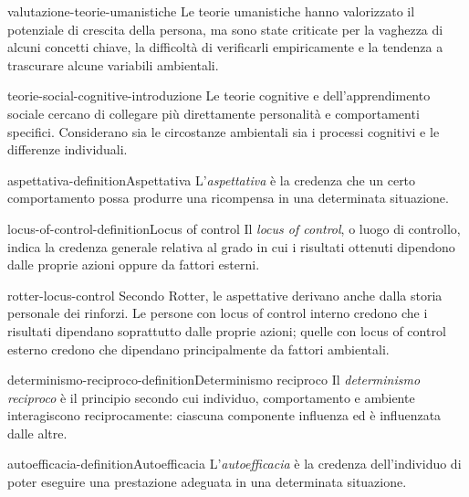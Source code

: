 \documentclass[preview]{standalone}
\begin{document}
\begin{snippet}{valutazione-teorie-umanistiche}
    Le teorie umanistiche hanno valorizzato il potenziale di crescita della
    persona, ma sono state criticate per la vaghezza di alcuni concetti chiave,
    la difficoltà di verificarli empiricamente e la tendenza a trascurare alcune
    variabili ambientali.
\end{snippet}

\begin{snippet}{teorie-social-cognitive-introduzione}
    Le teorie cognitive e dell'apprendimento sociale cercano di collegare più
    direttamente personalità e comportamenti specifici. Considerano sia le
    circostanze ambientali sia i processi cognitivi e le differenze individuali.
\end{snippet}

\begin{snippetdefinition}{aspettativa-definition}{Aspettativa}
    L'\emph{aspettativa} è la credenza che un certo comportamento possa produrre
    una ricompensa in una determinata situazione.
\end{snippetdefinition}

\begin{snippetdefinition}{locus-of-control-definition}{Locus of control}
    Il \emph{locus of control}, o luogo di controllo, indica la credenza
    generale relativa al grado in cui i risultati ottenuti dipendono dalle
    proprie azioni oppure da fattori esterni.
\end{snippetdefinition}

\begin{snippet}{rotter-locus-control}
    Secondo Rotter, le aspettative derivano anche dalla storia personale dei
    rinforzi. Le persone con locus of control interno credono che i risultati
    dipendano soprattutto dalle proprie azioni; quelle con locus of control
    esterno credono che dipendano principalmente da fattori ambientali.
\end{snippet}

\begin{snippetdefinition}{determinismo-reciproco-definition}{Determinismo reciproco}
    Il \emph{determinismo reciproco} è il principio secondo cui individuo,
    comportamento e ambiente interagiscono reciprocamente: ciascuna componente
    influenza ed è influenzata dalle altre.
\end{snippetdefinition}

\begin{snippetdefinition}{autoefficacia-definition}{Autoefficacia}
    L'\emph{autoefficacia} è la credenza dell'individuo di poter eseguire una
    prestazione adeguata in una determinata situazione.
\end{snippetdefinition}
\end{document}
